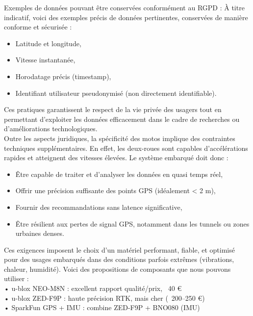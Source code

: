 Exemples de données pouvant être conservées conformément au RGPD :
À titre indicatif, voici des exemples précis de données pertinentes, conservées de manière conforme et sécurisée :
\begin{itemize}
\item Latitude et longitude,
\item Vitesse instantanée,
\item Horodatage précis (timestamp),
\item Identifiant utilisateur pseudonymisé (non directement identifiable).
\end{itemize}

Ces pratiques garantissent le respect de la vie privée des usagers tout en permettant d’exploiter les données efficacement dans le cadre de recherches ou d’améliorations technologiques.\\

\vspace{0.5cm}
Outre les aspects juridiques, la spécificité des motos implique des contraintes techniques supplémentaires. En effet, les deux-roues sont capables d’accélérations rapides et atteignent des vitesses élevées. Le système embarqué doit donc :
\begin{itemize}
  \item Être capable de traiter et d’analyser les données en quasi temps réel,
  \item Offrir une précision suffisante des points GPS (idéalement < 2 m),
  \item Fournir des recommandations sans latence significative,
  \item Être résilient aux pertes de signal GPS, notamment dans les tunnels ou zones urbaines denses.
\end{itemize}
Ces exigences imposent le choix d’un matériel performant, fiable, et optimisé pour des usages embarqués dans des conditions parfois extrêmes (vibrations, chaleur, humidité).
\vspace{0.5cm}
Voici des propositions de composants que nous pouvons utiliser : 	\\
•	u-blox NEO-M8N : excellent rapport qualité/prix, ~40 € \\
•	u-blox ZED-F9P : haute précision RTK, mais cher (~200–250 €) \\
•	SparkFun GPS + IMU : combine ZED-F9P + BNO080 (IMU)\\

